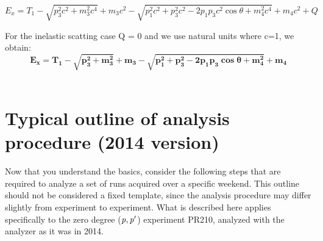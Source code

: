 \documentclass[11pt]{report}
\begin{document}
\begin{equation}
E_x = T_1 -\sqrt{p^2_3c^2+m_3^2c^4} + m_3c^2 - \sqrt{p_1^2c^2 + p_3^2c^2 - 2p_1p_3c^2\cos\theta+m_4^2c^4} + m_4c^2 + Q
\end{equation}

For the inelastic scatting case Q = 0 and we use natural units where c=1, we obtain:
\begin{equation}
\mathbf{E_x = T_1 -\sqrt{p^2_3+m_3^2} + m_3 - \sqrt{p_1^2 + p_3^2 - 2p_1p_3\cos\theta+m_4^2} + m_4}
\end{equation}
\\





\section{Typical outline of analysis procedure (2014 version)}

Now that you understand the basics, consider the following steps that are required to analyze
a set of runs acquired over a specific weekend.
This outline should not be considered a fixed template, since the analysis procedure may differ 
slightly from experiment to experiment.
What is described here applies specifically to the zero degree ($\it p,p'$) experiment PR210, analyzed
with the analyzer as it was in 2014.
\end{document}
